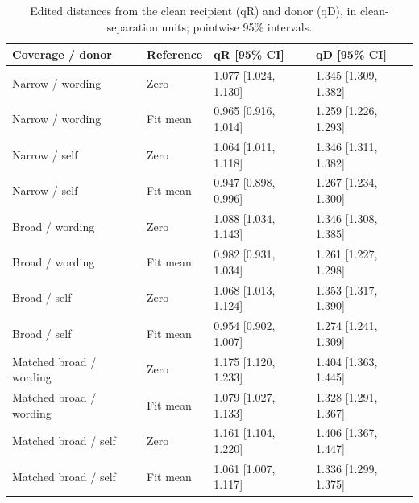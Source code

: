 \begin{table}[htbp]
\centering\footnotesize
\setlength{\tabcolsep}{3pt}
\caption{Edited distances from the clean recipient (qR) and donor (qD), in clean-separation units; pointwise 95\% intervals.}
\label{tab:b008-endpoints}
\begin{tabular}{@{}llll@{}}
\toprule
Coverage / donor & Reference & qR [95\% CI] & qD [95\% CI] \\
\midrule
Narrow / wording & Zero & 1.077 [1.024, 1.130] & 1.345 [1.309, 1.382] \\
Narrow / wording & Fit mean & 0.965 [0.916, 1.014] & 1.259 [1.226, 1.293] \\
Narrow / self & Zero & 1.064 [1.011, 1.118] & 1.346 [1.311, 1.382] \\
Narrow / self & Fit mean & 0.947 [0.898, 0.996] & 1.267 [1.234, 1.300] \\
Broad / wording & Zero & 1.088 [1.034, 1.143] & 1.346 [1.308, 1.385] \\
Broad / wording & Fit mean & 0.982 [0.931, 1.034] & 1.261 [1.227, 1.298] \\
Broad / self & Zero & 1.068 [1.013, 1.124] & 1.353 [1.317, 1.390] \\
Broad / self & Fit mean & 0.954 [0.902, 1.007] & 1.274 [1.241, 1.309] \\
Matched broad / wording & Zero & 1.175 [1.120, 1.233] & 1.404 [1.363, 1.445] \\
Matched broad / wording & Fit mean & 1.079 [1.027, 1.133] & 1.328 [1.291, 1.367] \\
Matched broad / self & Zero & 1.161 [1.104, 1.220] & 1.406 [1.367, 1.447] \\
Matched broad / self & Fit mean & 1.061 [1.007, 1.117] & 1.336 [1.299, 1.375] \\
\bottomrule
\end{tabular}
\end{table}

